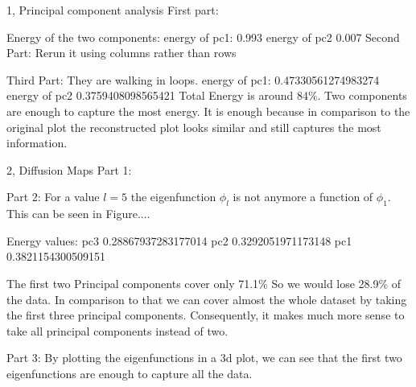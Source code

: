 \documentclass[10pt,a4paper]{article}
\begin{document}
\frontpage

\begin{task}{1, Principal component analysis}
First part: 

Energy of the two components: 
energy of pc1: 0.993 energy of pc2 0.007
Second Part: 
Rerun it using columns rather than rows 

Third Part: 
They are walking in loops. 
energy of pc1: 0.47330561274983274 
energy of pc2 0.3759408098565421 
Total Energy is around 84\%. Two components are enough to capture the most energy. 
It is enough because in comparison to the original plot the reconstructed plot looks similar and still captures the most information. 
\end{task}
\begin{task}{2, Diffusion Maps}
Part 1:

Part 2: 
For a value $l=5$ the eigenfunction $\phi_l$ is not anymore a function of $\phi_1$. This can be seen in Figure....

Energy values:  
pc3 0.28867937283177014  
pc2 0.3292051971173148  
pc1 0.3821154300509151 

The first two Principal components cover only 71.1\% So we would lose 28.9\% of the data.
In comparison to that we can cover almost the whole dataset by taking the first three principal components. Consequently, it makes much more sense to take all principal components instead of two. 

Part 3:
By plotting the eigenfunctions in a 3d plot, we can see that the first two eigenfunctions are enough to capture all the data.
\end{task}
\end{document}
